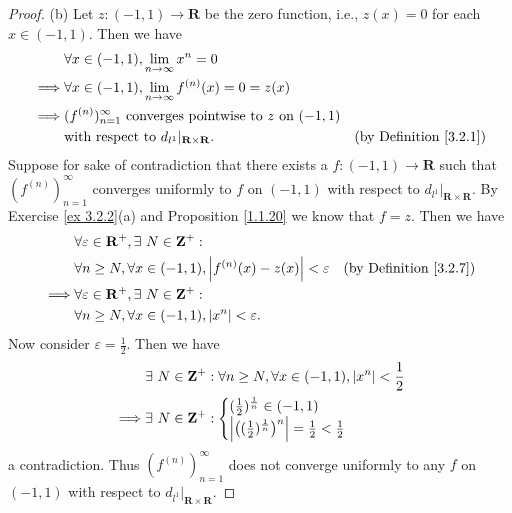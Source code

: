 \begin{proof}{(b)}
    Let \(z : (-1, 1) \to \mathbf{R}\) be the zero function, i.e., \(z(x) = 0\) for each \(x \in (-1, 1)\).
    Then we have
    \begin{align*}
                 & \forall x \in (-1, 1), \lim_{n \to \infty} x^n = 0                                                                  \\
        \implies & \forall x \in (-1, 1), \lim_{n \to \infty} f^{(n)}(x) = 0 = z(x)                                                    \\
        \implies & (f^{(n)})_{n = 1}^\infty \text{ converges pointwise to } z \text{ on } (-1, 1)                                      \\
                 & \text{with respect to } d_{l^1}|_{\mathbf{R} \times \mathbf{R}}.               & \text{(by Definition \ref{3.2.1})}
    \end{align*}
    Suppose for sake of contradiction that there exists a \(f : (-1, 1) \to \mathbf{R}\) such that \((f^{(n)})_{n = 1}^\infty\) converges uniformly to \(f\) on \((-1, 1)\) with respect to \(d_{l^1}|_{\mathbf{R} \times \mathbf{R}}\).
    By Exercise \ref{ex 3.2.2}(a) and Proposition \ref{1.1.20} we know that \(f = z\).
    Then we have
    \begin{align*}
                 & \forall \varepsilon \in \mathbf{R}^+, \exists\ N \in \mathbf{Z}^+ :                                                  \\
                 & \forall n \geq N, \forall x \in (-1, 1), \abs*{f^{(n)}(x) - z(x)} < \varepsilon & \text{(by Definition \ref{3.2.7})} \\
        \implies & \forall \varepsilon \in \mathbf{R}^+, \exists\ N \in \mathbf{Z}^+ :                                                  \\
                 & \forall n \geq N, \forall x \in (-1, 1), \abs*{x^n} < \varepsilon.
    \end{align*}
    Now consider \(\varepsilon = \frac{1}{2}\).
    Then we have
    \begin{align*}
                 & \exists\ N \in \mathbf{Z}^+ : \forall n \geq N, \forall x \in (-1, 1), \abs*{x^n} < \frac{1}{2}                                               \\
        \implies & \exists\ N \in \mathbf{Z}^+ : \begin{cases}
                                                     (\frac{1}{2})^{\frac{1}{n}} \in (-1, 1) \\
                                                     \abs*{\big((\frac{1}{2})^{\frac{1}{n}}\big)^n} = \frac{1}{2} < \frac{1}{2}
                                                 \end{cases}
    \end{align*}
    a contradiction.
    Thus \((f^{(n)})_{n = 1}^\infty\) does not converge uniformly to any \(f\) on \((-1, 1)\) with respect to \(d_{l^1}|_{\mathbf{R} \times \mathbf{R}}\).
\end{proof}

